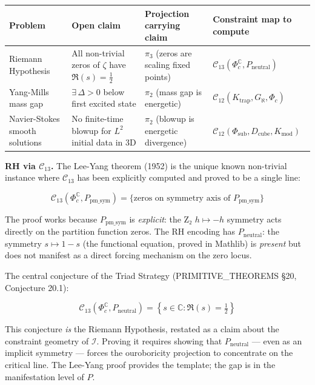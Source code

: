 \documentclass[12pt,a4paper]{article}
\newcommand{\pilcrow}{\S}
\begin{document}
\begin{table}[htbp]
\centering
\small
{}
\begin{tabularx}{\textwidth}{>{\centering\arraybackslash}X >{\centering\arraybackslash}X >{\centering\arraybackslash}X >{\centering\arraybackslash}X}
\toprule
\rowcolor{gray!25}\textbf{Problem} & \textbf{Open claim} & \textbf{Projection carrying claim} & \textbf{Constraint map to compute} \\
\midrule
\rowcolors{1}{white}{gray!10}
Riemann Hypothesis & All non-trivial zeros of $\zeta$ have $\Re(s) = \frac{1}{2}$ & $\pi_3$ (zeros are scaling fixed points) & $\mathcal{C}_{13}(\Phi_c^{\mathbb{C}}, P_\text{neutral})$ \\
Yang-Mills mass gap & $\exists\, \Delta > 0$ below first excited state & $\pi_2$ (mass gap is energetic) & $\mathcal{C}_{12}(K_\text{trap}, G_{\aleph}, \Phi_c)$ \\
Navier-Stokes smooth solutions & No finite-time blowup for $L^2$ initial data in 3D & $\pi_2$ (blowup is energetic divergence) & $\mathcal{C}_{12}(\Phi_\text{sub}, D_\text{cube}, K_\text{mod})$ \\
\bottomrule
\end{tabularx}
\end{table}

\textbf{RH via $\mathcal{C}_{13}$.} The Lee-Yang theorem (1952) is the unique known non-trivial instance where $\mathcal{C}_{13}$ has been explicitly computed and proved to be a single line:

\[\mathcal{C}_{13}(\Phi_c^{\mathbb{C}}, P_\text{pm\_sym}) = \{ \text{zeros on symmetry axis of } P_\text{pm\_sym} \}\]

The proof works because $P_\text{pm\_sym}$ is \emph{explicit}: the Z₂ $h \mapsto -h$ symmetry acts directly on the partition function zeros. The RH encoding has $P_\text{neutral}$: the symmetry $s \mapsto 1-s$ (the functional equation, proved in Mathlib) is \emph{present} but does not manifest as a direct forcing mechanism on the zero locus.

The central conjecture of the Triad Strategy (PRIMITIVE\_THEOREMS \pilcrow{}20, Conjecture 20.1):

\[\mathcal{C}_{13}(\Phi_c^{\mathbb{C}}, P_\text{neutral}) = \left\{ s \in \mathbb{C} : \Re(s) = \tfrac{1}{2} \right\}\]

This conjecture \emph{is} the Riemann Hypothesis, restated as a claim about the constraint geometry of $\mathcal{I}$. Proving it requires showing that $P_\text{neutral}$ --- even as an implicit symmetry --- forces the ouroboricity projection to concentrate on the critical line. The Lee-Yang proof provides the template; the gap is in the manifestation level of $P$.
\end{document}
